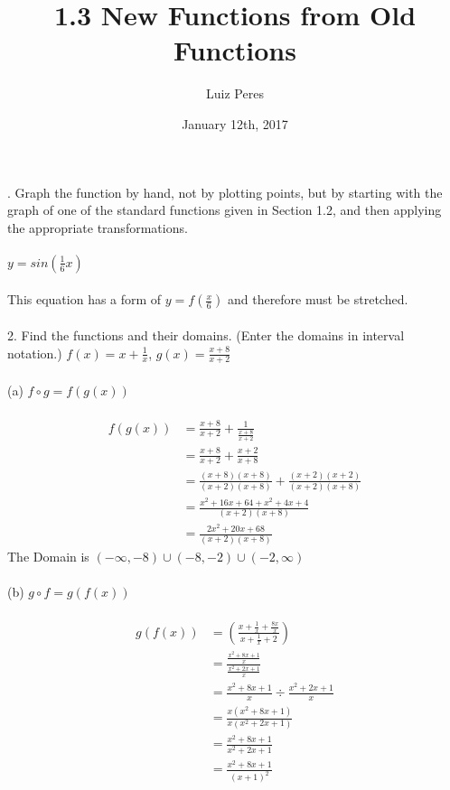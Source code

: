 \documentclass{article}
\title{1.3 New Functions from Old Functions}
\author{Luiz Peres}
\date{January 12th, 2017}
\begin{document}
. Graph the function by hand, not by plotting points, but by starting with the graph of one of the standard functions given in Section 1.2, and then applying the appropriate transformations.\\\\
$y = sin(\frac{1}{6}x)$\\\\
This equation has a form of $y = f(\frac{x}{6})$ and therefore must be stretched.\\\\
2. Find the functions and their domains. (Enter the domains in interval notation.) $f(x) = x + \frac{1}{x}$, $g(x) = \frac{x + 8}{x + 2}$\\\\
(a) $f \circ g = f(g(x))$\\\\
\begin{equation}
\begin{split}
    f(g(x)) & = \frac{x+8}{x+2} + \frac{1}{\frac{x+8}{x+2}}\\
    & = \frac{x+8}{x+2} + \frac{x+2}{x+8}\\
    & = \frac{(x+8)(x+8)}{(x+2)(x+8)} + \frac{(x+2)(x+2)}{(x+2)(x+8)}\\
    & = \frac{x^2 + 16x + 64 + x^2 + 4x + 4}{(x+2)(x+8)}\\
    & = \frac{2x^2 + 20x + 68}{(x+2)(x+8)}
\end{split}
\end{equation}
The Domain is $(-\infty, -8) \cup (-8, -2) \cup (-2, \infty)$\\\\
(b) $g \circ f = g(f(x))$\\\\
\begin{equation}
\begin{split}
    g(f(x)) & = (\frac{x + \frac{1}{x} + \frac{8x}{x}}{x + \frac{1}{x} + 2})\\
    & = \frac{\frac{x^2 + 8x + 1}{x}}{\frac{x^2 + 2x + 1}{x}}\\
    & = \frac{x^2 + 8x + 1}{x} \div \frac{x^2 + 2x + 1}{x}\\
    & = \frac{x(x^2 + 8x + 1)}{x(x^2 + 2x + 1)}\\
    & = \frac{x^2 + 8x + 1}{x^2 + 2x + 1}\\
    & = \frac{x^2 + 8x + 1}{(x + 1)^2}
\end{split}
\end{equation}
\end{document}
